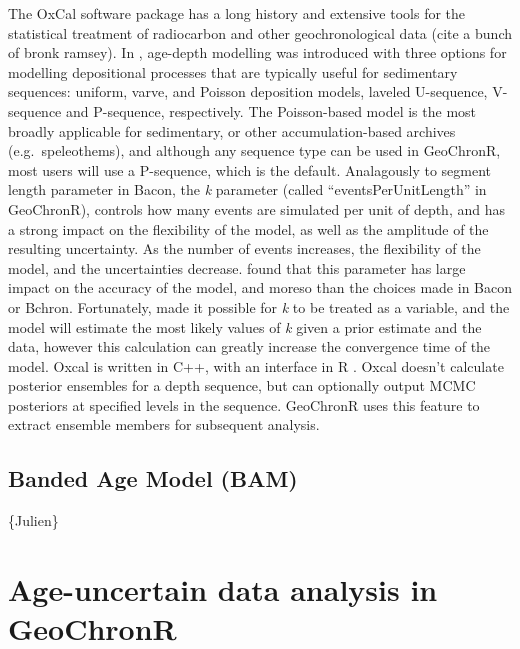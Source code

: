 \documentclass[gc, manuscript]{copernicus}
\begin{document}
The OxCal software package has a long history and extensive tools for the statistical treatment of radiocarbon and other geochronological data (cite a bunch of bronk ramsey).
In \citet{ramsey2008deposition}, age-depth modelling was introduced with three options for modelling depositional processes that are typically useful for sedimentary sequences: uniform, varve, and Poisson deposition models, laveled U-sequence, V-sequence and P-sequence, respectively.
The Poisson-based model is the most broadly applicable for sedimentary, or other accumulation-based archives (e.g.~speleothems), and although any sequence type can be used in GeoChronR, most users will use a P-sequence, which is the default.
Analagously to segment length parameter in Bacon, the \emph{k} parameter (called ``eventsPerUnitLength'' in GeoChronR), controls how many events are simulated per unit of depth, and has a strong impact on the flexibility of the model, as well as the amplitude of the resulting uncertainty.
As the number of events increases, the flexibility of the model, and the uncertainties decrease.
\citet{trachsel2017} found that this parameter has large impact on the accuracy of the model, and moreso than the choices made in Bacon or Bchron.
Fortunately, \citet{bronkramsey2010} made it possible for \emph{k} to be treated as a variable, and the model will estimate the most likely values of \emph{k} given a prior estimate and the data, however this calculation can greatly increase the convergence time of the model.
Oxcal is written in C++, with an interface in R \citep{oxcAAR}.
Oxcal doesn't calculate posterior ensembles for a depth sequence, but can optionally output MCMC posteriors at specified levels in the sequence.
GeoChronR uses this feature to extract ensemble members for subsequent analysis.

\subsection{Banded Age Model (BAM)}

\{Julien\}

\hypertarget{sec:age-uncertain-analysis}{%
\section{Age-uncertain data analysis in GeoChronR}\label{sec:age-uncertain-analysis}}
\end{document}
